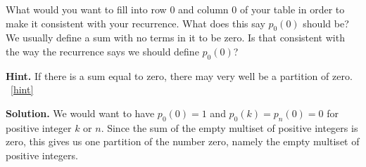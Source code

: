 \documentclass{book}
\begin{document}
\begin{activity}[]
\begin{enumerate}[font=\bfseries,label=(\alph*),ref=\alph*]
What would you want to fill into row 0 and column 0 of your table in order to make it consistent with your recurrence.  What does this say \(p_0(0)\) should be?  We usually define a sum with no terms in it to be zero. Is that consistent with the way the recurrence says we should define \(p_0(0)\)?%
\par\smallskip%
\noindent\textbf{Hint.}\hypertarget{hint-138}{}\quad%
\hypertarget{p-1190}{}%
If there is a sum equal to zero, there may very well be a partition of zero.%
~\hfill{\tiny\hyperlink{a-215.h}{[hint]}\hypertarget{q-215.h}{}}\par\smallskip%
\noindent\textbf{Solution.}\hypertarget{solution-122}{}\quad%
\hypertarget{p-1191}{}%
We would want to have \(p_0(0)=1\) and \(p_0(k)=p_n(0)=0\) for positive integer \(k\) or \(n\). Since the sum of the empty multiset of positive integers is zero, this gives us one partition of the number zero, namely the empty multiset of positive integers.%
\end{enumerate}
\end{activity}
\end{document}
